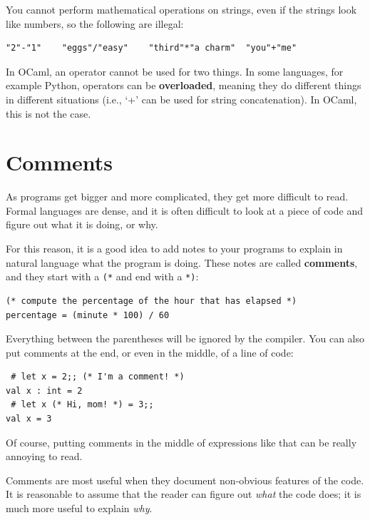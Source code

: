 \documentclass[10pt]{book}
\begin{document}
You cannot perform mathematical operations on strings, even
if the strings look like numbers, so the following are illegal:

\beforeverb
\begin{verbatim}
"2"-"1"    "eggs"/"easy"    "third"*"a charm"  "you"+"me"
\end{verbatim}
\afterverb

In OCaml, an operator cannot be used for two things. In some languages,
for example Python, operators can be {\bf overloaded}, meaning they do different
things in different situations (i.e., `+' can be used for string concatenation).
In OCaml, this is not the case.


\section{Comments}

As programs get bigger and more complicated, they get more difficult
to read.  Formal languages are dense, and it is often difficult to
look at a piece of code and figure out what it is doing, or why.

For this reason, it is a good idea to add notes to your programs to explain
in natural language what the program is doing.  These notes are called
{\bf comments}, and they start with a \verb"(*" and end with a \verb"*)":

\beforeverb
\begin{verbatim}
(* compute the percentage of the hour that has elapsed *)
percentage = (minute * 100) / 60
\end{verbatim}
\afterverb

Everything between the parentheses will be ignored by the compiler. 
You can also put comments at the end, or even in the middle, of a 
line of code:

\beforeverb
\begin{verbatim}
 # let x = 2;; (* I'm a comment! *)
val x : int = 2
 # let x (* Hi, mom! *) = 3;;
val x = 3
\end{verbatim}
\afterverb

Of course, putting comments in the middle of expressions like that can be really 
annoying to read.

Comments are most useful when they document non-obvious features of
the code.  It is reasonable to assume that the reader can figure out
{\em what} the code does; it is much more useful to explain {\em why}.
\end{document}
